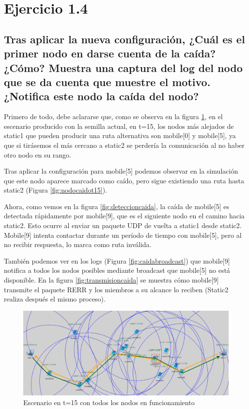 \vspace{1.25cm}
\section{Ejercicio 1.4}

\subsection{Tras aplicar la nueva configuración, ¿Cuál es el primer nodo en darse cuenta de la caída? ¿Cómo? Muestra una captura del log del nodo que se da cuenta que muestre el motivo. ¿Notifica este nodo la caída del nodo?}

Primero de todo, debe aclararse que, como se observa en la figura \ref{fig:escenariot15}, en el escenario producido con la semilla actual, en t=15, los nodos más alejados de static1 que pueden producir una ruta alternativa son mobile[0] y mobile[5], ya que si tirásemos el más cercano a static2 se perdería la comunicación al no haber otro nodo en su rango.

Tras aplicar la configuración para mobile[5] podemos observar en la simulación que este nodo aparece marcado como caído, pero sigue existiendo una ruta hasta static2 (Figura \ref{fig:nodocaidot15}).

Ahora, como vemos en la figura \ref{fig:deteccioncaida}, la caída de mobile[5] es detectada rápidamente por mobile[9], que es el siguiente nodo en el camino hacia static2. Esto ocurre al enviar un paquete UDP de vuelta a static1 desde static2. Mobile[9] intenta contactar durante un período de tiempo con mobile[5], pero al no recibir respuesta, lo marca como ruta inválida.

También podemos ver en los logs (Figura \ref{fig:caidabroadcast}) que mobile[9] notifica a todos los nodos posibles mediante broadcast que mobile[5] no está disponible. En la figura \ref{fig:transmisioncaida} se muestra cómo mobile[9] transmite el paquete RERR y los miembros a su alcance lo reciben (Static2 realiza después el mismo proceso).

\begin{figure}[H]
    \centering
    \includegraphics[width=125mm, scale=0.75]{imaxes/ejercicio4_1.png}
    \caption{Escenario en t=15 con todos los nodos en funcionamiento}
    \label{fig:escenariot15}
\end{figure}

